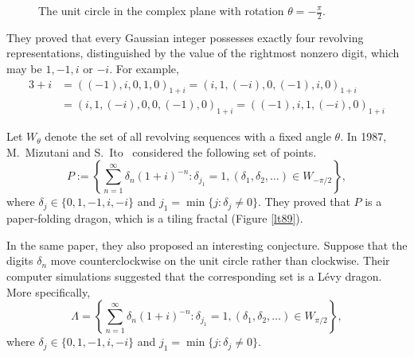 \documentclass[12pt, a4paper]{amsart}
\numberwithin{equation}{section}
\numberwithin{theorem}{section}
\begin{document}
\begin{figure}[h]
  \begin{center}
  \end{center} 
  \caption{The unit circle in the complex plane with rotation $\theta=-\frac{\pi}{2}$.}
  \label{lt81}
\end{figure} 

They proved that every Gaussian integer possesses exactly four revolving representations, distinguished by the value of the rightmost nonzero digit, which may be $1, -1, i$ or $-i$. For example, 
\begin{align*}
3+i &=((-1), i, 0, 1, 0)_{1+i} =(i, 1, (-i), 0, (-1), i, 0)_{1+i} \\
    &=(i, 1, (-i), 0, 0, (-1), 0)_{1+i} =((-1), i, 1, (-i), 0)_{1+i}
\end{align*}

Let $W_{\theta}$ denote the set of all revolving sequences with a fixed angle $\theta$. In 1987, M.~Mizutani and S.~Ito~\cite{Ito-1987} considered the following set of points. 
\begin{equation}
\label{Mizutani-Ito-X}
  P:=\left\{ \sum_{n=1}^{\infty} \delta_{n}(1+i)^{-n}: \delta_{j_1}=1, (\delta_{1}, \delta_{2}, \dots ) \in W_{-\pi/2} \right\},
\end{equation}
where $\delta_j \in \{0, 1, -1, i, -i\}$ and $j_1= \min\{j: \delta_j \neq 0\}$. 
They proved that $P$ is a paper-folding dragon, which is a tiling fractal (Figure \ref{lt89}).

In the same paper, they also proposed an interesting conjecture. Suppose that the digits $\delta_{n}$ move counterclockwise on the unit circle rather than clockwise. Their computer simulations suggested that the corresponding set is a L\'evy dragon. More specifically,
\begin{equation}
\label{lt82}
  \Lambda=\left\{ \sum_{n=1}^{\infty} \delta_{n}(1+i)^{-n}: \delta_{j_1}=1, (\delta_{1}, \delta_{2}, \dots ) \in W_{\pi/2} \right\},
\end{equation}
where $\delta_j \in \{0, 1, -1, i, -i\}$ and $j_1= \min\{j: \delta_j \neq 0\}$. 
\end{document}
